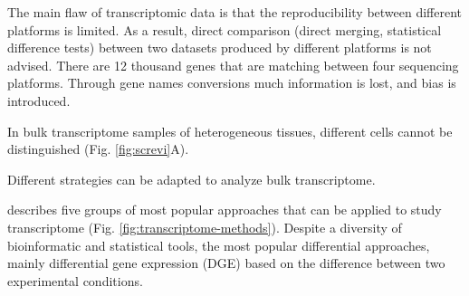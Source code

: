 \documentclass[12pt,]{book}
\theoremstyle{definition}
\theoremstyle{definition}
\theoremstyle{definition}
\theoremstyle{remark}
\begin{document}
The main flaw of transcriptomic data is that the reproducibility between
different platforms is limited. As a result, direct comparison (direct
merging, statistical difference tests) between two datasets produced by
different platforms is not advised. There are 12 thousand genes that are
matching between four sequencing platforms. Through gene names
conversions much information is lost, and bias is introduced.

In bulk transcriptome samples of heterogeneous tissues, different cells
cannot be distinguished (Fig. \ref{fig:screvi}A).

Different strategies can be adapted to analyze bulk transcriptome.

\citet{Cieslik2017} describes five groups of most popular approaches
that can be applied to study transcriptome (Fig.
\ref{fig:transcriptome-methods}). Despite a diversity of bioinformatic
and statistical tools, the most popular differential approaches, mainly
differential gene expression (DGE) based on the difference between two
experimental conditions.
\end{document}
